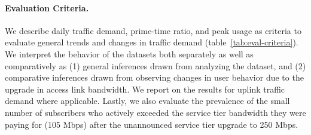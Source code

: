 \paragraph{Evaluation Criteria. }  We describe daily 
traffic demand, 
prime-time ratio, and peak usage as criteria to evaluate general trends 
and changes in traffic demand (table~\ref{tab:eval-criteria}). We interpret the 
behavior of the datasets both separately as well as comparatively as (1) 
general inferences drawn from analyzing the dataset,  and (2) comparative 
inferences drawn from observing changes in user behavior due to the upgrade in 
access link bandwidth. We report on the results for uplink traffic 
demand where applicable. Lastly, we also evaluate the prevalence of the 
small number of subscribers who actively exceeded the service tier bandwidth 
they were paying for (105 Mbps) after the unannounced service tier upgrade to 
250 Mbps.








